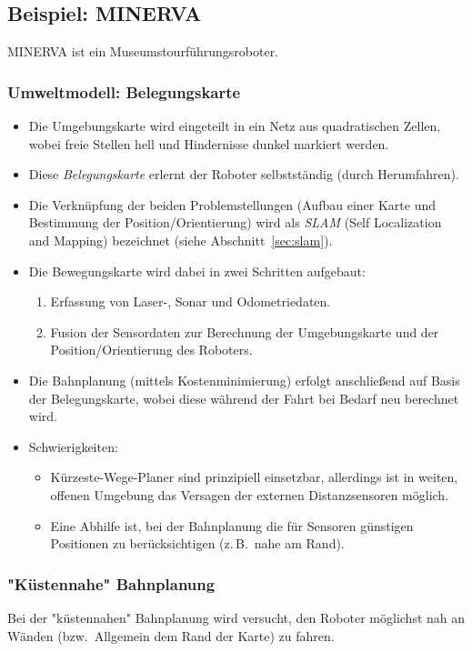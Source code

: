 \documentclass[a4paper, 11pt, accentcolor = tud3b]{tudreport}
\newcommand{\bzw}{bzw.~}
\newcommand{\zB}{z.\,B.~}
\begin{document}
			\subsection{Beispiel: MINERVA}
				MINERVA ist ein Museumstourführungsroboter.
				
				\subsubsection{Umweltmodell: Belegungskarte}
					\begin{itemize}
						\item Die Umgebungskarte wird eingeteilt in ein Netz aus quadratischen Zellen, wobei freie Stellen hell und Hindernisse dunkel markiert werden.
						\item Diese \emph{Belegungskarte} erlernt der Roboter selbstständig (durch Herumfahren).
						\item Die Verknüpfung der beiden Problemstellungen (Aufbau einer Karte und Bestimmung der Position/Orientierung) wird als \emph{SLAM} (Self Localization and Mapping) bezeichnet (siehe Abschnitt~\ref{sec:slam}).
						\item Die Bewegungskarte wird dabei in zwei Schritten aufgebaut:
							\begin{enumerate}
								\item Erfassung von Laser-, Sonar und Odometriedaten.
								\item Fusion der Sensordaten zur Berechnung der Umgebungskarte und der Position/Orientierung des Roboters.
							\end{enumerate}
						\item Die Bahnplanung (mittels Kostenminimierung) erfolgt anschließend auf Basis der Belegungskarte, wobei diese während der Fahrt bei Bedarf neu berechnet wird.
						\item Schwierigkeiten:
							\begin{itemize}
								\item Kürzeste-Wege-Planer sind prinzipiell einsetzbar, allerdings ist in weiten, offenen Umgebung das Versagen der externen Distanzsensoren möglich.
								\item Eine Abhilfe ist, bei der Bahnplanung die für Sensoren günstigen Positionen zu berücksichtigen (\zB nahe am Rand).
							\end{itemize}
					\end{itemize}

				\subsubsection{"Küstennahe" Bahnplanung}
					Bei der "küstennahen" Bahnplanung wird versucht, den Roboter möglichst nah an Wänden (\bzw Allgemein dem Rand der Karte) zu fahren.
\end{document}

